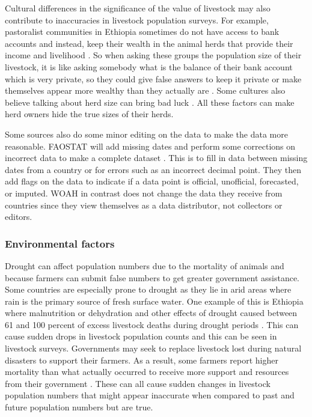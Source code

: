 \documentclass{article}
\begin{document}
Cultural differences in the significance of the value of livestock may also contribute to inaccuracies in livestock population surveys. For example, pastoralist communities in Ethiopia sometimes do not have access to bank accounts and instead, keep their wealth in the animal herds that provide their income and livelihood \citep{catley_livestock_2014}. 
So when asking these groups the population size of their livestock, it is like asking somebody what is the balance of their bank account which is very private, so they could give false answers to keep it private or make themselves appear more wealthy than they actually are \citep{catley_livestock_2014}. Some cultures also believe talking about herd size can bring bad luck \citep{international_wool_textile_organization_sheep_nodate}. All these factors can make herd owners hide the true sizes of their herds.

Some sources also do some minor editing on the data to make the data more reasonable. FAOSTAT will add missing dates and perform some corrections on incorrect data to make a complete dataset \citep{faostat_2019}. This is to fill in data between missing dates from a country or for errors such as an incorrect decimal point. They then add flags on the data to indicate if a data point is official, unofficial, forecasted, or imputed. WOAH in contrast does not change the data they receive from countries since they view themselves as a data distributor, not collectors or editors.

\subsubsection{Environmental factors}
Drought can affect population numbers due to the mortality of animals and because farmers can submit false numbers to get greater government assistance. Some countries are especially prone to drought as they lie in arid areas where rain is the primary source of fresh surface water. One example of this is Ethiopia where malnutrition or dehydration and other effects of drought caused between 61 and 100 percent of excess livestock deaths during drought periods \citep{catley_livestock_2014}. This can cause sudden drops in livestock population counts and this can be seen in livestock surveys. Governments may seek to replace livestock lost during natural disasters to support their farmers. As a result, some farmers report higher mortality than what actually occurred to receive more support and resources from their government \citep{catley_livestock_2014}. These can all cause sudden changes in livestock population numbers that might appear inaccurate when compared to past and future population numbers but are true.
\end{document}
